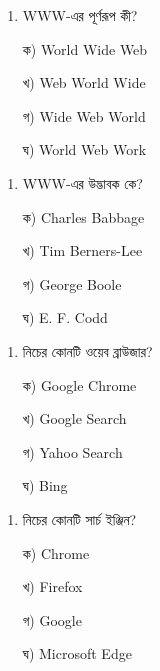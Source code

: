 \par\addvspace{4pt}\noindent
\begin{minipage}[t]{.48\linewidth}\vspace{0pt}
\begin{enumerate}[start=1,leftmargin=*,topsep=0pt,itemsep=0pt]
\item WWW-এর পূর্ণরূপ কী?
\par ক) World Wide Web
\par খ) Web World Wide
\par গ) Wide Web World
\par ঘ) World Web Work\\
\end{enumerate}
\end{minipage}
\hfill
\begin{minipage}[t]{.48\linewidth}\vspace{0pt}
\begin{enumerate}[start=2,leftmargin=*,topsep=0pt,itemsep=0pt]
\item WWW-এর উদ্ভাবক কে?
\par ক) Charles Babbage
\par খ) Tim Berners-Lee
\par গ) George Boole
\par ঘ) E. F. Codd\\
\end{enumerate}
\end{minipage}
\par

\par\addvspace{4pt}\noindent
\begin{minipage}[t]{.48\linewidth}\vspace{0pt}
\begin{enumerate}[start=3,leftmargin=*,topsep=0pt,itemsep=0pt]
\item নিচের কোনটি ওয়েব ব্রাউজার?
\par ক) Google Chrome
\par খ) Google Search
\par গ) Yahoo Search
\par ঘ) Bing\\
\end{enumerate}
\end{minipage}
\hfill
\begin{minipage}[t]{.48\linewidth}\vspace{0pt}
\begin{enumerate}[start=4,leftmargin=*,topsep=0pt,itemsep=0pt]
\item নিচের কোনটি সার্চ ইঞ্জিন?
\par ক) Chrome
\par খ) Firefox
\par গ) Google
\par ঘ) Microsoft Edge\\
\end{enumerate}
\end{minipage}
\par

